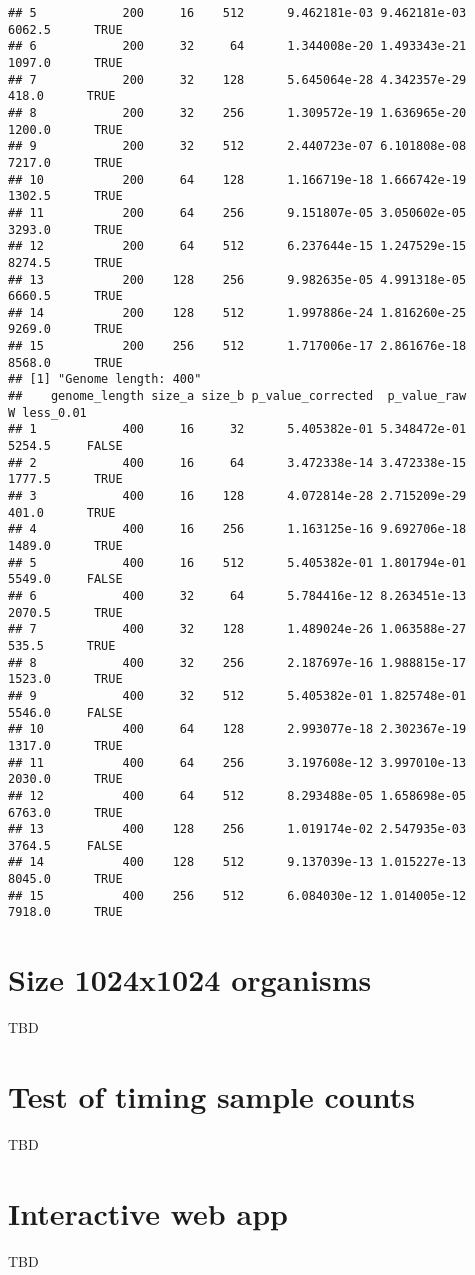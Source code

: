 \documentclass[]{book}
\begin{document}
\begin{verbatim}
## 5            200     16    512      9.462181e-03 9.462181e-03 6062.5      TRUE
## 6            200     32     64      1.344008e-20 1.493343e-21 1097.0      TRUE
## 7            200     32    128      5.645064e-28 4.342357e-29  418.0      TRUE
## 8            200     32    256      1.309572e-19 1.636965e-20 1200.0      TRUE
## 9            200     32    512      2.440723e-07 6.101808e-08 7217.0      TRUE
## 10           200     64    128      1.166719e-18 1.666742e-19 1302.5      TRUE
## 11           200     64    256      9.151807e-05 3.050602e-05 3293.0      TRUE
## 12           200     64    512      6.237644e-15 1.247529e-15 8274.5      TRUE
## 13           200    128    256      9.982635e-05 4.991318e-05 6660.5      TRUE
## 14           200    128    512      1.997886e-24 1.816260e-25 9269.0      TRUE
## 15           200    256    512      1.717006e-17 2.861676e-18 8568.0      TRUE
## [1] "Genome length: 400"
##    genome_length size_a size_b p_value_corrected  p_value_raw      W less_0.01
## 1            400     16     32      5.405382e-01 5.348472e-01 5254.5     FALSE
## 2            400     16     64      3.472338e-14 3.472338e-15 1777.5      TRUE
## 3            400     16    128      4.072814e-28 2.715209e-29  401.0      TRUE
## 4            400     16    256      1.163125e-16 9.692706e-18 1489.0      TRUE
## 5            400     16    512      5.405382e-01 1.801794e-01 5549.0     FALSE
## 6            400     32     64      5.784416e-12 8.263451e-13 2070.5      TRUE
## 7            400     32    128      1.489024e-26 1.063588e-27  535.5      TRUE
## 8            400     32    256      2.187697e-16 1.988815e-17 1523.0      TRUE
## 9            400     32    512      5.405382e-01 1.825748e-01 5546.0     FALSE
## 10           400     64    128      2.993077e-18 2.302367e-19 1317.0      TRUE
## 11           400     64    256      3.197608e-12 3.997010e-13 2030.0      TRUE
## 12           400     64    512      8.293488e-05 1.658698e-05 6763.0      TRUE
## 13           400    128    256      1.019174e-02 2.547935e-03 3764.5     FALSE
## 14           400    128    512      9.137039e-13 1.015227e-13 8045.0      TRUE
## 15           400    256    512      6.084030e-12 1.014005e-12 7918.0      TRUE
\end{verbatim}

\hypertarget{size-1024x1024-organisms}{%
\chapter{Size 1024x1024 organisms}\label{size-1024x1024-organisms}}

TBD

\hypertarget{test-of-timing-sample-counts}{%
\chapter{Test of timing sample counts}\label{test-of-timing-sample-counts}}

TBD

\hypertarget{interactive-web-app}{%
\chapter{Interactive web app}\label{interactive-web-app}}

TBD
\end{document}
